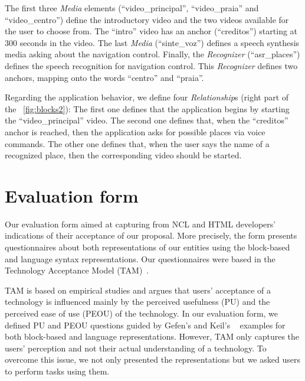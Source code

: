 \documentclass[
  doutorado,
  american
]{ThesisPUC}
\newcommand{\fig}[1]{\figurename~\ref{#1}}
\begin{document}
The first three \textit{Media} elements (“video\_principal”, “video\_praia” and 
“video\_centro”) define the introductory video and the two videos available for 
the user to choose from. The
“intro” video has an anchor (“creditos”) starting at 300 seconds in the video.
The last \textit{Media} (“sinte\_voz”) defines a speech synthesis media asking about the
navigation control. Finally, the \textit{Recognizer} (“asr\_places”) defines the
speech recognition for navigation control. This \textit{Recognizer} defines two 
anchors, mapping onto the words “centro” and “praia”.

Regarding the application behavior, we define four \textit{Relationship}s (right
part of the \fig{fig:blocks2}): The first one defines that the application
begins by starting the “video\_principal” video. The second one defines that,
when the “creditos” anchor is reached, then the application asks for possible
places via voice commands. The other one defines that, when the user says the
name of a recognized place, then the corresponding video should be started.

\section{Evaluation form}
\label{sec:evaluation:form}

Our evaluation form aimed at capturing from NCL and HTML developers’ indications
of their acceptance of our proposal. More precisely, the form presents
questionnaires about both representations of our entities using the block-based
and language syntax representations. Our questionnaires were based in the
Technology Acceptance Model (TAM)~\cite{davis_perceived_1989}.

TAM is based on empirical studies and argues that users’ acceptance of a
technology is influenced mainly by the perceived usefulness (PU) and the
perceived ease of use (PEOU) of the technology. In our evaluation form, we
defined PU and PEOU questions guided by Gefen’s and Keil’s
~\cite{gefen_impact_1998} examples for both block-based and language
representations. However, TAM only captures the users’ perception and not their
actual understanding of a technology. To overcome this issue, we not only
presented the representations but we asked users to perform tasks using them.
\end{document}
